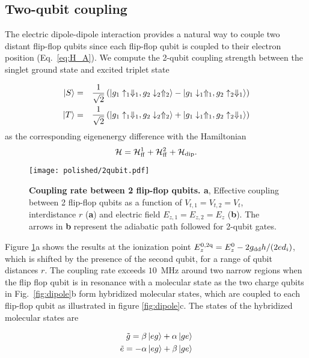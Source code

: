 \subsection{Two-qubit coupling}
The electric dipole-dipole interaction provides a natural way to couple two distant flip-flop qubits since each flip-flop qubit is coupled to their electron position (Eq.~\ref{eq:H_A}). We compute the 2-qubit coupling strength between the singlet ground state and excited triplet state

\begin{eqnarray}
\ket{S}&=&\frac{1}{\sqrt{2}}\left(\ket{g_1\uparrow_1\Downarrow_1, g_2\downarrow_2\Uparrow_2}-\ket{g_1\downarrow_1\Uparrow_1, g_2 \uparrow_2\Downarrow_1}\right)\\
\ket{T}&=&\frac{1}{\sqrt{2}}\left(\ket{g_1\uparrow_1\Downarrow_1, g_2\downarrow_2\Uparrow_2}+\ket{g_1\downarrow_1\Uparrow_1, g_2 \uparrow_2\Downarrow_1}\right)
\end{eqnarray}
as the corresponding eigenenergy difference with the Hamiltonian
\begin{equation}
\mathcal{H}=\mathcal{H}_{\rm ff}^1+\mathcal{H}_{\rm ff}^2+\mathcal{H}_{\rm dip}.
\end{equation}

\begin{figure}[h]
	\centering
	\texttt{[image: polished/2qubit.pdf]}
	\caption[Coupling rate between 2 flip-flop qubits]{\textbf{Coupling rate between 2 flip-flop qubits. a}, Effective coupling between 2 flip-flop qubits as a function of $V_{t,1}=V_{t,2}=V_t$, interdistance $r$ (\textbf{a}) and electric field $E_{z,1}=E_{z,2}=E_z$ (\textbf{b}). The arrows in \textbf{b} represent the adiabatic path followed for 2-qubit gates. }
	\label{fig:2-qubit}
\end{figure}

 Figure \ref{fig:2-qubit}a shows the results at the ionization point $E_z^{\rm 0,2q}=E_z^0-2g_{\rm dd}h/(2ed_i)$, which is shifted by the presence of the second qubit, for a range of qubit distances $r$. The coupling rate exceeds $10$~MHz around two narrow regions when the flip flop qubit is in resonance with a molecular state as the two charge qubits in Fig.~\ref{fig:dipole}b form hybridized molecular states, which are coupled to each flip-flop qubit as illustrated in figure \ref{fig:dipole}c. The states of the hybridized molecular states are
 
\begin{eqnarray}
\tilde{g}=\beta\ket{eg}+\alpha\ket{ge}\\
\tilde{e}=-\alpha\ket{eg}+\beta\ket{ge}
\end{eqnarray}

